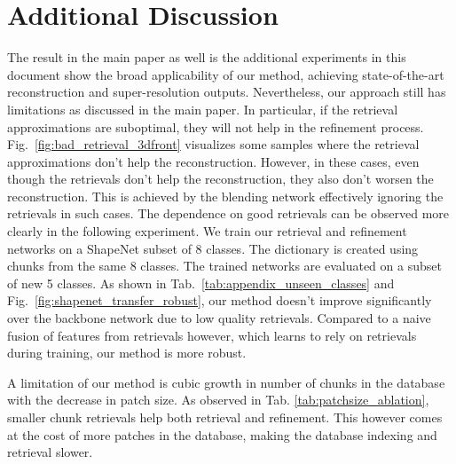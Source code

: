 
\section{Additional Discussion}

The result in the main paper as well is the additional experiments in this document show the broad applicability of our method, achieving state-of-the-art reconstruction and super-resolution outputs.
%
Nevertheless, our approach still has limitations as discussed in the main paper.
%
In particular, if the retrieval approximations are suboptimal, they will not help in the refinement process.
%
Fig.~\ref{fig:bad_retrieval_3dfront} visualizes some samples where the retrieval approximations don't help the reconstruction.
%
However, in these cases, even though the retrievals don't help the reconstruction, they also don't worsen the reconstruction.
%
This is achieved by the blending network effectively ignoring the retrievals in such cases.
%
The dependence on good retrievals can be observed more clearly in the following experiment.
%
We train our retrieval and refinement networks on a ShapeNet subset of $8$ classes.
%
The dictionary is created using chunks from the same $8$ classes.
%
The trained networks are evaluated on a subset of new 5 classes.
%
As shown in Tab.~\ref{tab:appendix_unseen_classes} and Fig.~\ref{fig:shapenet_transfer_robust}, our method doesn't improve significantly over the backbone network due to low quality retrievals.
%
Compared to a naive fusion of features from retrievals however, which learns to rely on retrievals during training, our method is more robust.
%

%
A limitation of our method is cubic growth in number of chunks in the database with the decrease in patch size.
%
As observed in Tab. \ref{tab:patchsize_ablation}, smaller chunk retrievals help both retrieval and refinement.
%
This however comes at the cost of more patches in the database, making the database indexing and retrieval slower.
%
